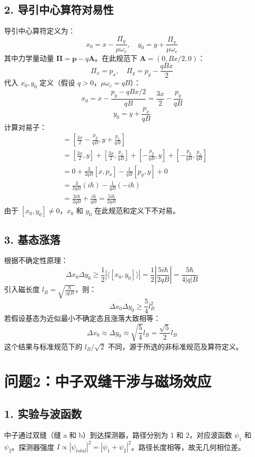 \documentclass[12pt]{article}
\begin{document}
\subsection*{2. 导引中心算符对易性}
导引中心算符定义为：
\[ x_0 = x - \frac{\Pi_y}{\mu\omega_c}, \quad y_0 = y + \frac{\Pi_x}{\mu\omega_c} \]
其中力学量动量 \(\mathbf{\Pi} = \mathbf{p} - q\mathbf{A}\)。在此规范下 \(\mathbf{A} = (0, Bx/2, 0)\)：
\[ \Pi_x = p_x, \quad \Pi_y = p_y - \frac{qBx}{2} \]
代入 \(x_0, y_0\) 定义（假设 \(q>0\)，\(\mu\omega_c = qB\)）：
\[ x_0 = x - \frac{p_y - qBx/2}{qB} = \frac{3x}{2} - \frac{p_y}{qB} \]
\[ y_0 = y + \frac{p_x}{qB} \]
计算对易子：
\begin{align*} [x_0, y_0] &= \left[ \frac{3x}{2} - \frac{p_y}{qB}, y + \frac{p_x}{qB} \right] \\ &= \left[\frac{3x}{2}, y\right] + \left[\frac{3x}{2}, \frac{p_x}{qB}\right] + \left[-\frac{p_y}{qB}, y\right] + \left[-\frac{p_y}{qB}, \frac{p_x}{qB}\right] \\ &= 0 + \frac{3}{2qB} [x, p_x] - \frac{1}{qB} [p_y, y] + 0 \\ &= \frac{3}{2qB} (i\hbar) - \frac{1}{qB} (-i\hbar) \\ &= \frac{3i\hbar}{2qB} + \frac{i\hbar}{qB} = \frac{5i\hbar}{2qB} \end{align*}
由于 \([x_0, y_0] \neq 0\)，\(x_0\) 和 \(y_0\) 在此规范和定义下不对易。

\subsection*{3. 基态涨落}
根据不确定性原理：
\[ \Delta x_0 \Delta y_0 \ge \frac{1}{2} |\langle [x_0, y_0] \rangle| = \frac{1}{2} \left| \frac{5i\hbar}{2qB} \right| = \frac{5\hbar}{4|q|B} \]
引入磁长度 \(l_B = \sqrt{\frac{\hbar}{|q|B}}\)，则：
\[ \Delta x_0 \Delta y_0 \ge \frac{5}{4} l_B^2 \]
若假设基态为近似最小不确定态且涨落大致相等：
\[ \Delta x_0 \approx \Delta y_0 \approx \sqrt{\frac{5}{4}} l_B = \frac{\sqrt{5}}{2} l_B \]
这个结果与标准规范下的 \(l_B/\sqrt{2}\) 不同，源于所选的非标准规范及算符定义。

\newpage %

\section*{问题2：中子双缝干涉与磁场效应}

\subsection*{1. 实验与波函数}
中子通过双缝（缝 a 和 b）到达探测器，路径分别为 1 和 2，对应波函数 \(\psi_1\) 和 \(\psi_2\)。探测器强度 \(I \propto |\psi_{total}|^2 = |\psi_1 + \psi_2|^2\)。路径长度相等，故无几何相位差。
\end{document}
